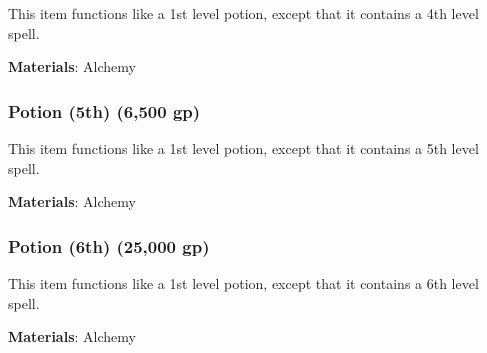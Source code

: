 This item functions like a 1st level potion, except that it contains a 4th level spell.



\textbf{Materials}: Alchemy


\lowercase{\hypertarget{item:Potion (5th)}{}}\label{item:Potion (5th)}
\hypertarget{item:Potion (5th)}{\subsubsection{Potion (5th)\hfill{} (6,500 gp)}}

This item functions like a 1st level potion, except that it contains a 5th level spell.



\textbf{Materials}: Alchemy


\lowercase{\hypertarget{item:Potion (6th)}{}}\label{item:Potion (6th)}
\hypertarget{item:Potion (6th)}{\subsubsection{Potion (6th)\hfill{} (25,000 gp)}}

This item functions like a 1st level potion, except that it contains a 6th level spell.



\textbf{Materials}: Alchemy
